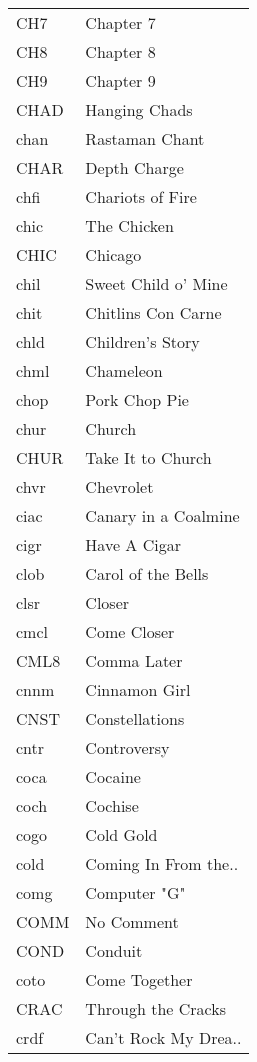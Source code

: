 \begin{supertabular}{ll}
  CH7 &             Chapter 7 \\
  CH8 &             Chapter 8 \\
  CH9 &             Chapter 9 \\
 CHAD &         Hanging Chads \\
 chan &        Rastaman Chant \\
 CHAR &          Depth Charge \\
 chfi &      Chariots of Fire \\
 chic &           The Chicken \\
 CHIC &               Chicago \\
 chil &   Sweet Child o' Mine \\
 chit &    Chitlins Con Carne \\
 chld &      Children's Story \\
 chml &             Chameleon \\
 chop &         Pork Chop Pie \\
 chur &                Church \\
 CHUR &     Take It to Church \\
 chvr &             Chevrolet \\
 ciac &  Canary in a Coalmine \\
 cigr &          Have A Cigar \\
 clob &    Carol of the Bells \\
 clsr &                Closer \\
 cmcl &           Come Closer \\
 CML8 &           Comma Later \\
 cnnm &         Cinnamon Girl \\
 CNST &        Constellations \\
 cntr &           Controversy \\
 coca &               Cocaine \\
 coch &               Cochise \\
 cogo &             Cold Gold \\
 cold &  Coming In From the.. \\
 comg &          Computer "G" \\
 COMM &            No Comment \\
 COND &               Conduit \\
 coto &         Come Together \\
 CRAC &    Through the Cracks \\
 crdf &  Can't Rock My Drea.. \\

\end{supertabular}
